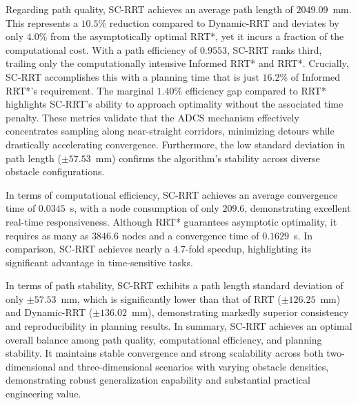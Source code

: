 \documentclass[sn-mathphys-num]{sn-jnl}%
\begin{document}
Regarding path quality, SC-RRT achieves an average path length of $2049.09$~mm. This represents a $10.5\%$ reduction compared to Dynamic-RRT and deviates by only $4.0\%$ from the asymptotically optimal RRT*, yet it incurs a fraction of the computational cost. With a path efficiency of $0.9553$, SC-RRT ranks third, trailing only the computationally intensive Informed RRT* and RRT*. Crucially, SC-RRT accomplishes this with a planning time that is just $16.2\%$ of Informed RRT*'s requirement. The marginal $1.40\%$ efficiency gap compared to RRT* highlights SC-RRT's ability to approach optimality without the associated time penalty. These metrics validate that the ADCS mechanism effectively concentrates sampling along near-straight corridors, minimizing detours while drastically accelerating convergence. Furthermore, the low standard deviation in path length ($\pm 57.53$~mm) confirms the algorithm's stability across diverse obstacle configurations.

In terms of computational efficiency, SC-RRT achieves an average convergence time of $0.0345$~s, with a node consumption of only $209.6$, demonstrating excellent real-time responsiveness. Although RRT* guarantees asymptotic optimality, it requires as many as $3846.6$ nodes and a convergence time of $0.1629$~s. In comparison, SC-RRT achieves nearly a $4.7$-fold speedup, highlighting its significant advantage in time-sensitive tasks.

In terms of path stability, SC-RRT exhibits a path length standard deviation of only $\pm 57.53$~mm, which is significantly lower than that of RRT ($\pm 126.25$~mm) and Dynamic-RRT ($\pm 136.02$~mm), demonstrating markedly superior consistency and reproducibility in planning results. In summary, SC-RRT achieves an optimal overall balance among path quality, computational efficiency, and planning stability. It maintains stable convergence and strong scalability across both two-dimensional and three-dimensional scenarios with varying obstacle densities, demonstrating robust generalization capability and substantial practical engineering value.
\end{document}
